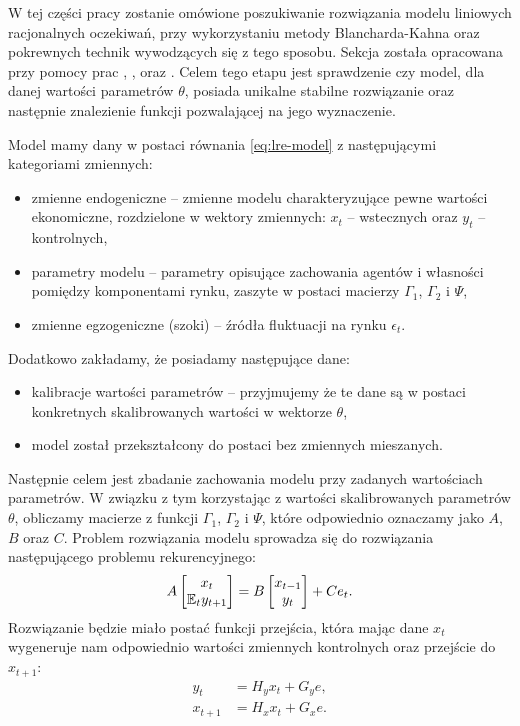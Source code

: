W tej części pracy zostanie omówione poszukiwanie rozwiązania modelu liniowych racjonalnych oczekiwań, przy wykorzystaniu metody Blancharda-Kahna oraz pokrewnych technik wywodzących się z tego sposobu. Sekcja została opracowana przy pomocy prac \cite{10.2307/1912186}, \cite{King1998TheSO}, \cite{RePEc:cpm:dynare:002} oraz \cite{KLEIN20001405}. Celem tego etapu jest sprawdzenie czy model, dla danej wartości parametrów $\theta$, posiada unikalne stabilne rozwiązanie oraz następnie znalezienie funkcji pozwalającej na jego wyznaczenie.

Model mamy dany w postaci równania \eqref{eq:lre-model} z następującymi kategoriami zmiennych:
\begin{itemize}
    \item zmienne endogeniczne -- zmienne modelu charakteryzujące pewne wartości ekonomiczne, rozdzielone w wektory zmiennych: $x_t$ -- wstecznych oraz $y_t$ -- kontrolnych,
    \item parametry modelu -- parametry opisujące zachowania agentów i własności pomiędzy komponentami rynku, zaszyte w postaci macierzy $\Gamma_1$, $\Gamma_2$ i $\Psi$,
    \item zmienne egzogeniczne (szoki) -- źródła fluktuacji na rynku $\epsilon_t$.
\end{itemize}
Dodatkowo zakładamy, że posiadamy następujące dane:
\begin{itemize}
    \item kalibracje wartości parametrów -- przyjmujemy że te dane są w postaci konkretnych skalibrowanych wartości w wektorze $\theta$,
    \item model został przekształcony do postaci bez zmiennych mieszanych.
\end{itemize}
Następnie celem jest zbadanie zachowania modelu przy zadanych wartościach parametrów. W związku z tym korzystając z wartości skalibrowanych parametrów $\theta$, obliczamy macierze z funkcji $\Gamma_1$, $\Gamma_2$ i $\Psi$, które odpowiednio oznaczamy jako $A$, $B$ oraz $C$. Problem rozwiązania modelu sprowadza się do rozwiązania następującego problemu rekurencyjnego:
\begin{equation}
    \label{eqn:lreEquation}
    A \begin{bmatrix}
    x_{t} \\
    \mathbb{E}_t y_{t+1}
\end{bmatrix} = B \begin{bmatrix}
    x_{t-1} \\
    y_{t}
\end{bmatrix} + C e_t.
\end{equation}
Rozwiązanie będzie miało postać funkcji przejścia, która mając dane $x_t$ wygeneruje nam odpowiednio wartości zmiennych kontrolnych oraz przejście do $x_{t+1}$:
\begin{align}
\label{eqn:bkproblem}
    y_t &= H_y x_t + G_y e,\\
    x_{t+1} &= H_x x_t + G_x e. \nonumber
\end{align}

